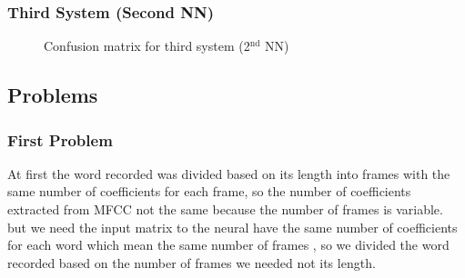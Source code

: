 \documentclass[12pt, a4paper, twoside]{report}
\begin{document}
\subsubsection{Third System (Second NN)}
\begin{figure}[!h]
\begin{floatrow}
{%
  \caption{Confusion matrix for third system (2$^{\text{nd}}$ NN)}
  \label{fig:nn-4}
}
\end{floatrow}
\end{figure}

\subsection{Problems}
\subsubsection{First Problem}
At first the word recorded was divided based on its length into frames with the same number of coefficients for each frame, so the number of coefficients extracted from MFCC not the same because the number of frames is variable.
but we need the input matrix to the neural have the same number of coefficients for each word which mean the same number of frames , so we divided the word recorded based on the number of frames we needed not its length.
\end{document}
